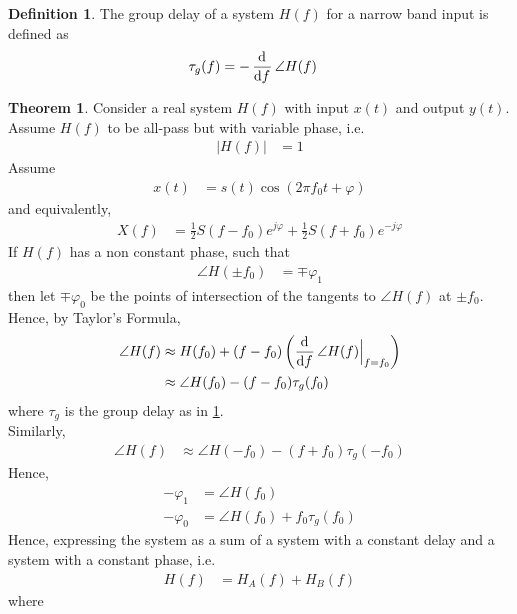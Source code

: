 \documentclass[titlepage, fleqn, a4paper, 12pt, twoside]{article}
\theoremstyle{definition}
\newtheorem{definition}{Definition}
\theoremstyle{theorem}
\newtheorem{theorem}{Theorem}
\begin{document}
\begin{definition}
	The group delay of a system $H(f)$ for a narrow band input is defined as
	\begin{align*}
		\tau_g(f) &= -\dod{}{f} \angle H(f)
	\end{align*}
	\label{def:group_delay}
\end{definition}

\begin{theorem}
	Consider a real system $H(f)$ with input $x(t)$ and output $y(t)$.
	Assume $H(f)$ to be all-pass but with variable phase, i.e.
	\begin{align*}
		\left| H(f) \right| &= 1
	\end{align*}
	Assume
	\begin{align*}
		x(t) &= s(t) \cos\left( 2 \pi f_0 t + \varphi \right)
	\end{align*}
	and equivalently,
	\begin{align*}
		X(f) &= \frac{1}{2} S(f - f_0) e^{j \varphi} + \frac{1}{2} S(f + f_0) e^{-j \varphi}
	\end{align*}
	If $H(f)$ has a non constant phase, such that
	\begin{align*}
		\angle H(\pm f_0) &= \mp \varphi_1
	\end{align*}
	then let $\mp \varphi_0$ be the points of intersection of the tangents to $\angle H(f)$ at $\pm f_0$.\\
	Hence, by Taylor's Formula,
	\begin{align*}
		\angle H(f) &\approx H(f_0) + (f - f_0) \left( \dod{}{f} \angle H(f) \Big|_{f = f_0} \right)\\
		&\approx \angle H(f_0) - (f - f_0) \tau_g(f_0)
	\end{align*}
	where $\tau_g$ is the group delay as in \cref{def:group_delay}.\\
	Similarly,
	\begin{align*}
		\angle H(f) &\approx \angle H(-f_0) - (f + f_0) \tau_g(-f_0)
	\end{align*}
	Hence,
	\begin{align*}
		-\varphi_1 &= \angle H(f_0)\\
		-\varphi_0 &= \angle H(f_0) + f_0 \tau_g(f_0)
	\end{align*}
	Hence, expressing the system as a sum of a system with a constant delay and a system with a constant phase, i.e.
	\begin{align*}
		H(f) &= H_A(f) + H_B(f)
	\end{align*}
	where
	\begin{align*}

\end{align*}
\end{theorem}
\end{document}
